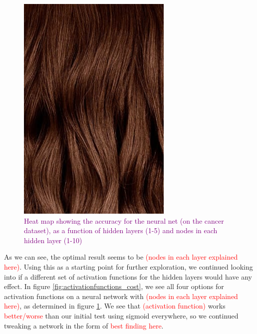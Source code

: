 \begin{figure}
    \centering
    \includegraphics[width=\linewidth]{figures/placeholders/gridsearch_layers_nodes.png}
    \caption{\textcolor{purple}{Heat map showing the accuracy for the neural net (on the cancer dataset), as a function of hidden layers (1-5) and nodes in each hidden layer (1-10)}}
    \label{fig:gridsearch_layers_nodes}
\end{figure}

As we can see, the optimal result seems to be \textcolor{red}{(nodes in each layer explained here)}. Using this as a starting point for further exploration, we continued looking into if a different set of activation functions for the hidden layers would have any effect. In figure \ref{fig:activationfunctions_cost}, we see all four options for activation functions on a neural network with \textcolor{red}{(nodes in each layer explained here)}, as determined in figure \ref{fig:gridsearch_layers_nodes}. We see that \textcolor{red}{(activation function)} works \textcolor{red}{better/worse} than our initial test using sigmoid everywhere, so we continued tweaking a network in the form of \textcolor{red}{best finding here}.

